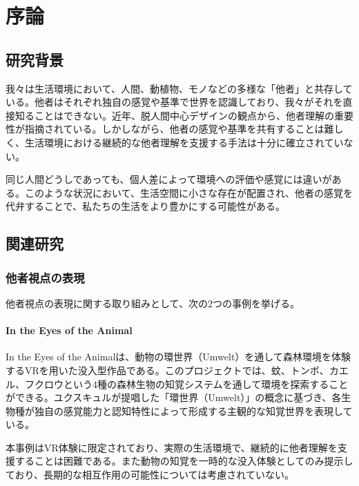 \documentclass{cuxarticle}
\begin{document}
\begin{titlepage}
  
\end{titlepage}

\tableofcontents

\chapter{序論}

\section{研究背景}
我々は生活環境において、人間、動植物、モノなどの多様な「他者」と共存している。他者はそれぞれ独自の感覚や基準で世界を認識しており、我々がそれを直接知ることはできない。近年、脱人間中心デザインの観点から、他者理解の重要性が指摘されている。しかしながら、他者の感覚や基準を共有することは難しく、生活環境における継続的な他者理解を支援する手法は十分に確立されていない。

同じ人間どうしであっても、個人差によって環境への評価や感覚には違いがある。このような状況において、生活空間に小さな存在が配置され、他者の感覚を代弁することで、私たちの生活をより豊かにする可能性がある。

\section{関連研究}

\subsection{他者視点の表現}
他者視点の表現に関する取り組みとして、次の2つの事例を挙げる。

\subsubsection{In the Eyes of the Animal}
In the Eyes of the Animal\cite{--EyesAnimal}は、動物の環世界（Umwelt）を通して森林環境を体験するVRを用いた没入型作品である。このプロジェクトでは、蚊、トンボ、カエル、フクロウという4種の森林生物の知覚システムを通して環境を探索することができる。ユクスキュルが提唱した「環世界（Umwelt）」の概念に基づき、各生物種が独自の感覚能力と認知特性によって形成する主観的な知覚世界を表現している。

本事例はVR体験に限定されており、実際の生活環境で、継続的に他者理解を支援することは困難である。また動物の知覚を一時的な没入体験としてのみ提示しており、長期的な相互作用の可能性については考慮されていない。
\end{document}
